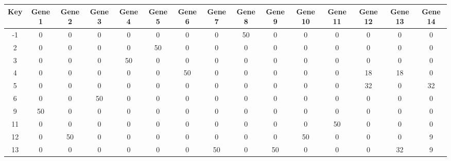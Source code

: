 \begin{tabular}{|c|c|c|c|c|c|c|c|c|c|c|c|c|c|c|}
\hline
Key & Gene 1 & Gene 2 & Gene 3 & Gene 4 & Gene 5 & Gene 6 & Gene 7 & Gene 8 & Gene 9 & Gene 10 & Gene 11 & Gene 12 & Gene 13 & Gene 14 \\
\hline
-1 & 0 & 0 & 0 & 0 & 0 & 0 & 0 & 50 & 0 & 0 & 0 & 0 & 0 & 0 \\
2 & 0 & 0 & 0 & 0 & 50 & 0 & 0 & 0 & 0 & 0 & 0 & 0 & 0 & 0 \\
3 & 0 & 0 & 0 & 50 & 0 & 0 & 0 & 0 & 0 & 0 & 0 & 0 & 0 & 0 \\
4 & 0 & 0 & 0 & 0 & 0 & 50 & 0 & 0 & 0 & 0 & 0 & 18 & 18 & 0 \\
5 & 0 & 0 & 0 & 0 & 0 & 0 & 0 & 0 & 0 & 0 & 0 & 32 & 0 & 32 \\
6 & 0 & 0 & 50 & 0 & 0 & 0 & 0 & 0 & 0 & 0 & 0 & 0 & 0 & 0 \\
9 & 50 & 0 & 0 & 0 & 0 & 0 & 0 & 0 & 0 & 0 & 0 & 0 & 0 & 0 \\
11 & 0 & 0 & 0 & 0 & 0 & 0 & 0 & 0 & 0 & 0 & 50 & 0 & 0 & 0 \\
12 & 0 & 50 & 0 & 0 & 0 & 0 & 0 & 0 & 0 & 50 & 0 & 0 & 0 & 9 \\
13 & 0 & 0 & 0 & 0 & 0 & 0 & 50 & 0 & 50 & 0 & 0 & 0 & 32 & 9 \\
\hline
\end{tabular}
